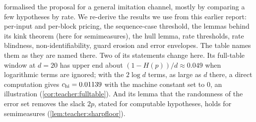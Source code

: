 \label{rem:related:t5} formalised the proposal for a general imitation channel, mostly by comparing a few hypotheses by rate. We re-derive the results we use from this earlier report: per-input and per-block pricing, the sequence-case threshold, the lemmas behind its kink theorem (here for semimeasures), the hull lemma, rate thresholds, rate blindness, non-identifiability, guard erosion and error envelopes. The table names them as they are named there. Two of its statements change here. Its full-table window at $d=20$ has upper end about $(1-H(p))/d\approx0.049$ when logarithmic terms are ignored; with the $2\log d$ terms, as large as $d$ there, a direct computation gives $c_{\rm hi}=0.01139$ with the machine constant set to $0$, an illustration (\cref{cor:teacher:fulltable}). And its lemma that the randomness of the error set removes the slack $2p$, stated for computable hypotheses, holds for semimeasures (\cref{lem:teacher:sharpfloor}).

